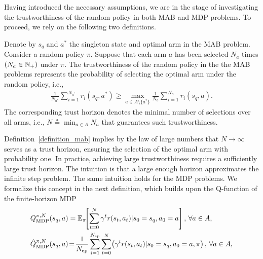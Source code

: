 Having introduced the necessary assumptions, we are in the stage of investigating the trustworthiness of the random policy in both MAB and MDP problems. To  proceed, we rely on the following two definitions.

\begin{definition}[MAB]\label{definition_mab}
    Denote by $s_q$ and $a^*$ the singleton state and optimal arm in the MAB problem. Consider a random policy $\pi$. Suppose that each arm $a$ has been selected $N_a$ times $(N_a \in {\ensuremath{\mathbb N}}_+)$ under $\pi$. The trustworthiness of the random policy in the the MAB problems represents the probability of selecting the optimal arm under the random policy, i.e., 
    \begin{align}\label{eqn_assump_bandit}
        \frac{1}{N_{a^*}}  \sum_{i=1}^{N_{a^*}} r_i(s_q, a^*) \geq \max_{a \in A \setminus \{a^*\}} \frac{1}{N_{a}} \sum_{i=1}^{N_{a}}  r_i(s_q, a).
    \end{align}
    The corresponding trust horizon denotes the minimal number of selections over all arms, i.e., $N\triangleq \min_{a \in A}  N_a$ that guarantees such trustworthiness.
\end{definition}
%
%
%
%
%
%
%
Definition~\ref{definition_mab} implies by the law of large numbers that $N\to \infty$ serves as a trust horizon, ensuring the selection of the optimal arm with probability one. In practice, achieving large trustworthiness requires a sufficiently large trust horizon. The intuition is that a large enough horizon approximates the infinite step problem. The same intuition holds for the MDP problems.
We formalize this concept in the next definition, which builds upon the Q-function of the finite-horizon MDP
%
\begin{align}
    &Q_\text{MDP}^{\pi, N}(s_q, a) = {\mathbb E}_\pi \!\! \left[ \sum_{t=0}^{N} \gamma^t r(s_t, a_t) | s_0=s_q, a_0=a \right],\, \forall a \in A, \\
    &\hat{Q}_\text{MDP}^{\pi, N}(s_q, a) \!=\! \frac{1}{N_\text{ep}} \sum_{i=1}^{N_\text{ep}} \sum_{t=0}^{N} \! \left( \gamma^t r(s_t, a_t) | s_0=s_q, a_0=a, \pi \right),\, \forall a \in A, \label{eqn_Q_mdp_N_hat}
\end{align}
